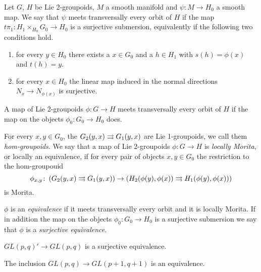 %
%

Let $G$, $H$ be Lie 2-groupoids, $M$ a smooth manifold and $\psi\colon M\to H_0$ a smooth map.
We say that $\psi$ meets transversally every orbit of $H$ if the map
$t\pi_1\colon H_1\times_{H_0} G_0 \to H_0$
is a surjective submersion, equivalently if the following two conditions hold.
\begin{enumerate}
\item for every $y\in H_0$ there exists a $x\in G_0$ and a $h\in H_1$ with $s(h) = \phi(x)$ and $t(h) = y$.
\item for every $x\in H_0$ the linear map induced in the normal directions $N_x\to N_{\phi(x)}$ is surjective.
\end{enumerate}
A map of Lie 2-groupoids $\phi\colon G\to H$ meets transversally every orbit of $H$ if the map on the objects $\phi_0\colon G_0\to H_0$ does.

For every $x, y\in G_0$, the $G_2(y,x)\rightrightarrows G_1(y,x)$ are Lie 1-groupoids, we call them \emph{hom-groupoids}.
We say that a map of Lie 2-groupoids $\phi\colon G\to H$ is \emph{locally Morita}, or locally an equivalence, if for every pair of objects $x, y\in G_0$ the restriction to the hom-groupouid
\[ \phi_{x,y}\colon \left( G_2(y,x)\rightrightarrows G_1(y,x) \right) \to \left( H_2(\phi(y),\phi(x))\rightrightarrows H_1(\phi(y),\phi(x)) \right) \]
is Morita.

\begin{mydef}
$\phi$ is an \emph{equivalence} if it meets transversally every orbit and it is locally Morita.
If in addition the map on the objects $\phi_0\colon G_0\to H_0$ is a surjective submersion we say that $\phi$ is a \emph{surjective equivalence}.
\end{mydef}

\begin{example}
$GL(p,q)' \to GL(p,q)$ is a surjective equivalence.
\end{example}

\begin{example}
The inclusion $GL(p,q) \to GL(p+1,q+1)$ is an equivalence.
\end{example}
